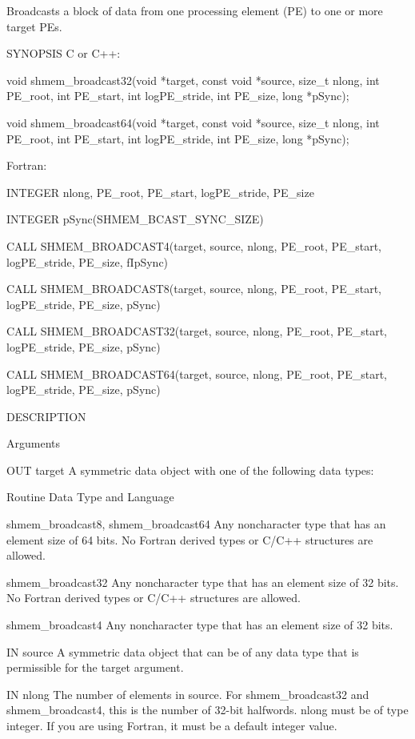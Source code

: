 Broadcasts a block  of  data from  one  processing element (PE) to one or more target PEs.

SYNOPSIS
       C or C++:

	  void	shmem_broadcast32(void	*target,  const	 void  *source, size_t
	  nlong, int PE_root, int PE_start,  int  logPE_stride,	 int  PE_size,
	  long *pSync);

	  void	shmem_broadcast64(void	*target,  const	 void  *source, size_t
	  nlong, int PE_root, int PE_start,  int  logPE_stride,	 int  PE_size,
	  long *pSync);

       Fortran:

	  INTEGER nlong, PE_root, PE_start, logPE_stride, PE_size

	  INTEGER pSync(SHMEM_BCAST_SYNC_SIZE)

	  CALL	SHMEM_BROADCAST4(target,  source,  nlong,  PE_root,  PE_start,
	  logPE_stride, PE_size, fIpSync)

	  CALL	SHMEM_BROADCAST8(target,  source,  nlong,  PE_root,  PE_start,
	  logPE_stride, PE_size, pSync)

	  CALL	SHMEM_BROADCAST32(target,  source,  nlong,  PE_root, PE_start,
	  logPE_stride, PE_size, pSync)

	  CALL SHMEM_BROADCAST64(target,  source,  nlong,  PE_root,  PE_start,
	  logPE_stride, PE_size, pSync)

DESCRIPTION

Arguments

       OUT	target	   A symmetric data object with	 one  of  the  following  data
			   types:

			   Routine		 Data Type and Language

			   shmem_broadcast8, 
			   shmem_broadcast64	 Any  noncharacter  type  that	has an
						 element size of 64 bits.  No  Fortran
						 derived types or C/C++ structures are
						 allowed.

			   shmem_broadcast32	 Any noncharacter  type	 that  has  an
						 element  size of 32 bits.  No Fortran
						 derived types or C/C++ structures are
						 allowed.

			   shmem_broadcast4	 Any  noncharacter  type  that	has an
						 element size of 32 bits.

       IN	source	   A symmetric data object that can be of any data  type  that
			   is permissible for the target argument.

       IN	nlong	   The	number	of  elements in source.	 For shmem_broadcast32
		   and	shmem_broadcast4,  this	 is  the  number   of	32-bit
		   halfwords.	nlong  must  be	 of  type integer.  If you are
		   using Fortran, it must be a default integer value.

